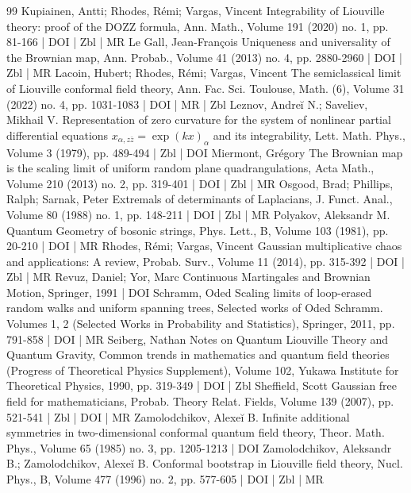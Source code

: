 \documentclass[10pt]{amsart}
\theoremstyle{definition}\newtheorem{defi}[theo]{Definition}\newtheorem{rema}[theo]{Remark}\newtheorem{exam}[theo]{Example}\newtheorem{exem}[theo]{Example}\newtheorem{nota}[theo]{Notation}
\begin{document}
\begin{thebibliography}{99}
Kupiainen, Antti; Rhodes, Rémi; Vargas, Vincent Integrability of Liouville theory: proof of the DOZZ formula, Ann. Math., Volume 191 (2020) no. 1, pp. 81-166 | DOI | Zbl | MR
Le Gall, Jean-François Uniqueness and universality of the Brownian map, Ann. Probab., Volume 41 (2013) no. 4, pp. 2880-2960 | DOI | Zbl | MR
Lacoin, Hubert; Rhodes, Rémi; Vargas, Vincent The semiclassical limit of Liouville conformal field theory, Ann. Fac. Sci. Toulouse, Math. (6), Volume 31 (2022) no. 4, pp. 1031-1083 | DOI | MR | Zbl
Leznov, Andreĭ N.; Saveliev, Mikhail V. Representation of zero curvature for the system of nonlinear partial differential equations $x_{\alpha ,z\bar{z}}=\exp (kx)_\alpha $ and its integrability, Lett. Math. Phys., Volume 3 (1979), pp. 489-494 | Zbl | DOI
Miermont, Grégory The Brownian map is the scaling limit of uniform random plane quadrangulations, Acta Math., Volume 210 (2013) no. 2, pp. 319-401 | DOI | Zbl | MR
Osgood, Brad; Phillips, Ralph; Sarnak, Peter Extremals of determinants of Laplacians, J. Funct. Anal., Volume 80 (1988) no. 1, pp. 148-211 | DOI | Zbl | MR
Polyakov, Aleksandr M. Quantum Geometry of bosonic strings, Phys. Lett., B, Volume 103 (1981), pp. 20-210 | DOI | MR
Rhodes, Rémi; Vargas, Vincent Gaussian multiplicative chaos and applications: A review, Probab. Surv., Volume 11 (2014), pp. 315-392 | DOI | Zbl | MR
Revuz, Daniel; Yor, Marc Continuous Martingales and Brownian Motion, Springer, 1991 | DOI
Schramm, Oded Scaling limits of loop-erased random walks and uniform spanning trees, Selected works of Oded Schramm. Volumes 1, 2 (Selected Works in Probability and Statistics), Springer, 2011, pp. 791-858 | DOI | MR
Seiberg, Nathan Notes on Quantum Liouville Theory and Quantum Gravity, Common trends in mathematics and quantum field theories (Progress of Theoretical Physics Supplement), Volume 102, Yukawa Institute for Theoretical Physics, 1990, pp. 319-349 | DOI | Zbl
Sheffield, Scott Gaussian free field for mathematicians, Probab. Theory Relat. Fields, Volume 139 (2007), pp. 521-541 | Zbl | DOI | MR
Zamolodchikov, Alexeĭ B. Infinite additional symmetries in two-dimensional conformal quantum field theory, Theor. Math. Phys., Volume 65 (1985) no. 3, pp. 1205-1213 | DOI
Zamolodchikov, Aleksandr B.; Zamolodchikov, Alexeĭ B. Conformal bootstrap in Liouville field theory, Nucl. Phys., B, Volume 477 (1996) no. 2, pp. 577-605 | DOI | Zbl | MR
\end{thebibliography}
\end{document}
